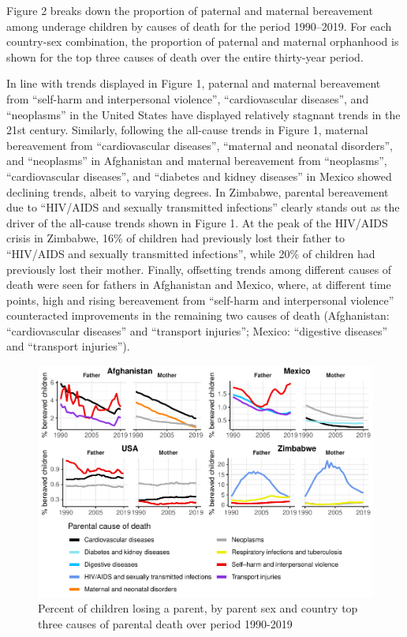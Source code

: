 \documentclass[
  11pt,
  letterpaper,
]{article}
\begin{document}
Figure 2 breaks down the proportion of paternal and maternal bereavement among underage children by causes of death for the period 1990--2019. For each country-sex combination, the proportion of paternal and maternal orphanhood is shown for the top three causes of death over the entire thirty-year period.

In line with trends displayed in Figure 1, paternal and maternal bereavement from ``self-harm and interpersonal violence'', ``cardiovascular diseases'', and ``neoplasms'' in the United States have displayed relatively stagnant trends in the 21st century. Similarly, following the all-cause trends in Figure 1, maternal bereavement from ``cardiovascular diseases'', ``maternal and neonatal disorders'', and ``neoplasms'' in Afghanistan and maternal bereavement from ``neoplasms'', ``cardiovascular diseases'', and ``diabetes and kidney diseases'' in Mexico showed declining trends, albeit to varying degrees. In Zimbabwe, parental bereavement due to ``HIV/AIDS and sexually transmitted infections'' clearly stands out as the driver of the all-cause trends shown in Figure 1. At the peak of the HIV/AIDS crisis in Zimbabwe, 16\% of children had previously lost their father to ``HIV/AIDS and sexually transmitted infections'', while 20\% of children had previously lost their mother. Finally, offsetting trends among different causes of death were seen for fathers in Afghanistan and Mexico, where, at different time points, high and rising bereavement from ``self-harm and interpersonal violence'' counteracted improvements in the remaining two causes of death (Afghanistan: ``cardiovascular diseases'' and ``transport injuries''; Mexico: ``digestive diseases'' and ``transport injuries'').

\begin{figure}
\centering
\includegraphics{parental_loss_global_paa_ext_abstract_files/figure-latex/perc-ber-top-1.pdf}
\caption{\label{fig:perc-ber-top}Percent of children losing a parent, by parent sex and country top three causes of parental death over period 1990-2019}
\end{figure}
\end{document}
